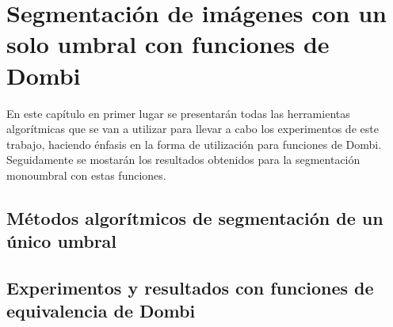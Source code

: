 \chapter{Segmentación de imágenes con un solo umbral con funciones de Dombi}\label{monoumbral}

En este capítulo en primer lugar se presentarán todas las herramientas algorítmicas que se van a utilizar para llevar a cabo los experimentos de este trabajo, haciendo énfasis en la forma de utilización para funciones de Dombi. Seguidamente se mostarán los resultados obtenidos para la segmentación monoumbral con estas funciones.


\section{Métodos algorítmicos de segmentación de un único umbral}\label{sec:algoritmosmono}



\section{Experimentos y resultados con funciones de equivalencia de Dombi}\label{sec:resultadosmono}
